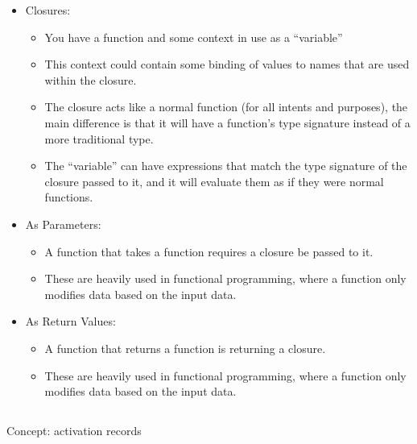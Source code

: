 \begin{itemize}
\item Closures:
  \begin{itemize}[noitemsep]
  \item You have a function and some context in use as a ``variable''
  \item This context could contain some binding of values to names that are used within the closure.
  \item The closure acts like a normal function (for all intents and purposes), the main difference is that it will have a function's type signature instead of a more traditional type.
  \item The ``variable'' can have expressions that match the type signature of the closure passed to it, and it will evaluate them as if they were normal functions.
  \end{itemize}

\item As Parameters:
  \begin{itemize}[noitemsep]
  \item A function that takes a function requires a closure be passed to it.
  \item These are heavily used in functional programming, where a function only modifies data based on the input data.
  \end{itemize}

\item As Return Values:
  \begin{itemize}[noitemsep]
  \item A function that returns a function is returning a closure.
  \item These are heavily used in functional programming, where a function only modifies data based on the input data.
  \end{itemize}
\end{itemize}

\subsection{}
Concept: activation records


